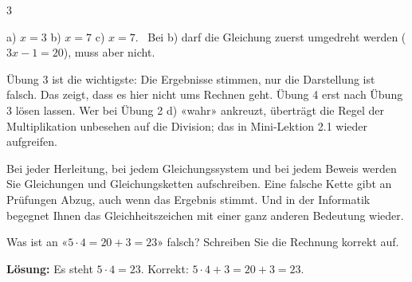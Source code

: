 \documentclass[11pt]{exam}
\begin{document}
\begin{questions}
\begin{multicols}{3}
\end{multicols}
\begin{solution}
  a) $x = 3$ \quad b) $x = 7$ \quad c) $x = 7$. \ Bei b) darf die Gleichung
  zuerst umgedreht werden ($3x - 1 = 20$), muss aber nicht.
\end{solution}
\raum{5cm}

\end{questions}

\begin{lehrperson}[Übungen]
Übung 3 ist die wichtigste: Die Ergebnisse stimmen, nur die Darstellung ist
falsch. Das zeigt, dass es hier nicht ums Rechnen geht. Übung 4 erst nach
Übung 3 lösen lassen. Wer bei Übung 2 d) «wahr» ankreuzt, überträgt die
Regel der Multiplikation unbesehen auf die Division; das in Mini-Lektion 2.1
wieder aufgreifen.
\end{lehrperson}


\begin{ausblick}
Bei jeder Herleitung, bei jedem Gleichungssystem und bei jedem Beweis werden
Sie Gleichungen und Gleichungsketten aufschreiben. Eine falsche Kette gibt an
Prüfungen Abzug, auch wenn das Ergebnis stimmt. Und in der Informatik
begegnet Ihnen das Gleichheitszeichen mit einer ganz anderen Bedeutung wieder.
\end{ausblick}

\begin{exitfrage}
Was ist an «$5 \cdot 4 = 20 + 3 = 23$» falsch? Schreiben Sie die Rechnung
korrekt auf.
\ifprintanswers\par\medskip\textbf{Lösung:} Es steht $5 \cdot 4 = 23$.
Korrekt: $5 \cdot 4 + 3 = 20 + 3 = 23$.\else\par\vspace{2cm}\fi
\end{exitfrage}
\end{document}
